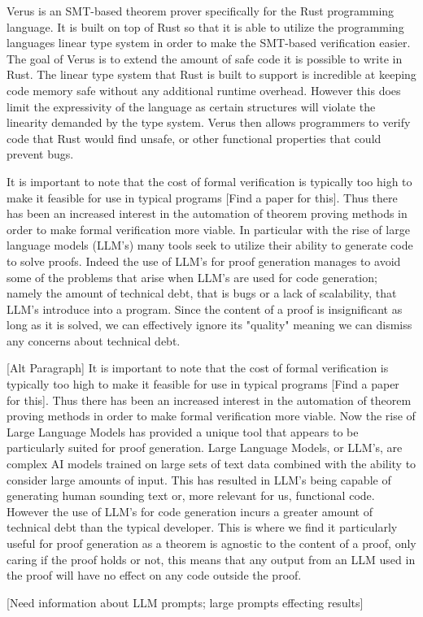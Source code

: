 Verus is an SMT-based theorem prover specifically for the Rust programming language. It is built on top of Rust so that it is able to utilize the programming languages linear type system in order to make the SMT-based verification easier.
The goal of Verus is to extend the amount of safe code it is possible to write in Rust. The linear type system that Rust is built to support is incredible at keeping code memory safe without any additional runtime overhead. However this 
does limit the expressivity of the language as certain structures will violate the linearity demanded by the type system. Verus then allows programmers to verify code that Rust would find unsafe, or other functional properties that could
prevent bugs.

It is important to note that the cost of formal verification is typically too high to make it feasible for use in typical programs [Find a paper for this]. Thus there has been an increased interest in the automation of theorem proving
methods in order to make formal verification more viable. In particular with the rise of large language models (LLM's) many tools seek to utilize their ability to generate code to solve proofs. Indeed the use of LLM's for proof 
generation manages to avoid some of the problems that arise when LLM's are used for code generation; namely the amount of technical debt, that is bugs or a lack of scalability, that LLM's introduce into a program. Since the content
of a proof is insignificant as long as it is solved, we can effectively ignore its "quality" meaning we can dismiss any concerns about technical debt.

[Alt Paragraph] 
It is important to note that the cost of formal verification is typically too high to make it feasible for use in typical programs [Find a paper for this]. Thus there has been an increased interest in the automation of theorem proving
methods in order to make formal verification more viable. Now the rise of Large Language Models has provided a unique tool that appears to be particularly suited for proof generation. Large Language Models, or LLM's, are complex AI models 
trained on large sets of text data combined with the ability to consider large amounts of input. This has resulted in LLM's being capable of generating human sounding text or, more relevant for us, functional code. However the use of 
LLM's for code generation incurs a greater amount of technical debt than the typical developer. This is where we find it particularly useful for proof generation as a theorem is agnostic to the content of a proof, only caring if the proof
holds or not, this means that any output from an LLM used in the proof will have no effect on any code outside the proof.

[Need information about LLM prompts; large prompts effecting results]